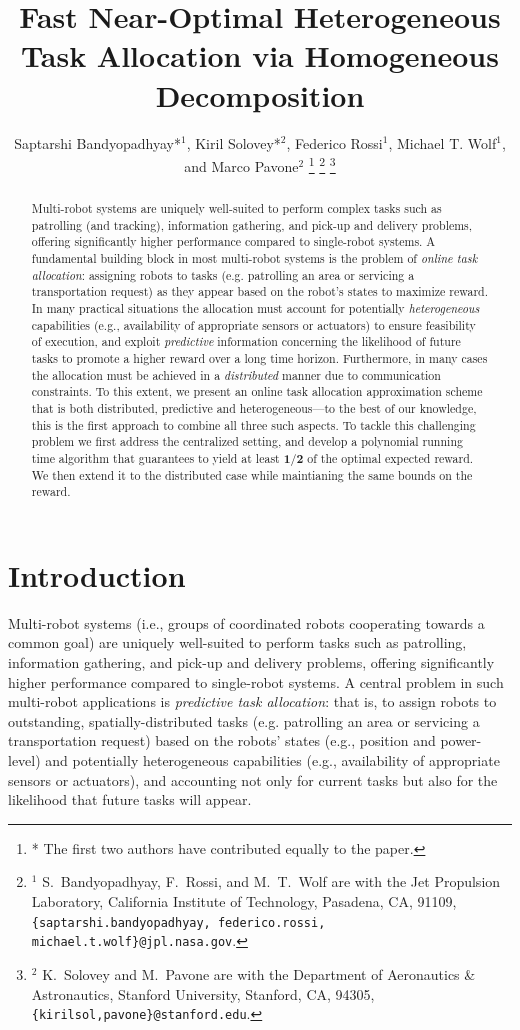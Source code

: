 \documentclass[conference]{IEEEtran}
\title{Fast Near-Optimal Heterogeneous Task Allocation via Homogeneous Decomposition}
\author{Saptarshi Bandyopadhyay*$^1$, Kiril Solovey*$^2$, Federico Rossi$^1$, Michael T. Wolf$^1$, and Marco Pavone$^2$
\thanks{* The first two authors have contributed equally to the paper.}
\thanks{$^1$ S.\ Bandyopadhyay, F.\ Rossi, and M.\ T.\ Wolf are with the Jet Propulsion Laboratory, California Institute of Technology, Pasadena, CA, 91109, {\tt \{saptarshi.bandyopadhyay, federico.rossi, michael.t.wolf\}@jpl.nasa.gov}.}
\thanks{$^2$ K.\ Solovey and M.\ Pavone are with the Department of Aeronautics \& Astronautics, Stanford University, Stanford, CA, 94305, {\tt \{kirilsol,pavone\}@stanford.edu}.}}
\begin{document}
\maketitle

\begin{abstract}
Multi-robot systems are uniquely well-suited to perform complex tasks such as patrolling (and tracking), information gathering, and pick-up and delivery problems, offering significantly higher performance compared to single-robot systems.
A fundamental building block in most multi-robot systems is the problem of \emph{online task allocation}: assigning robots to tasks (e.g. patrolling an area or servicing a transportation request) as they appear based on the robot's states to maximize reward. In many practical situations the allocation must account for potentially \emph{heterogeneous} capabilities (e.g., availability of appropriate sensors or actuators) to ensure feasibility of execution, and exploit \emph{predictive} information concerning the likelihood of future tasks to promote a higher reward over a long time horizon. Furthermore, in many cases the allocation must be achieved in a \emph{distributed} manner due to communication constraints. To this extent, we present an online task allocation approximation scheme that is both distributed, predictive and heterogeneous---to the best of our knowledge, this is the first approach to combine all three such aspects. To tackle this challenging problem we first address the centralized setting, and develop a polynomial running time algorithm that guarantees to yield at least $\bm{1/2}$ of the optimal expected reward. We then extend it to the distributed case while maintianing the same bounds on the reward.
\end{abstract}

\section{Introduction}
Multi-robot systems (i.e., groups of coordinated robots cooperating towards a common goal) are uniquely well-suited to perform tasks such as patrolling, information gathering, and pick-up and delivery problems, offering significantly higher performance compared to single-robot systems. A central problem in such multi-robot applications is \emph{predictive task allocation}: that is, to assign robots to outstanding, spatially-distributed tasks (e.g. patrolling an area or servicing a transportation request) based on the robots' states (e.g., position and power-level) and potentially heterogeneous capabilities (e.g., availability of appropriate sensors or actuators), and accounting not only for current tasks but also for the likelihood that future tasks will appear.
\end{document}
